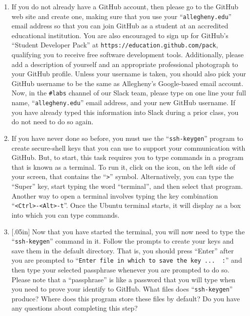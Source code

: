 \documentclass[11pt]{article}
\newcommand{\command}[1]{``\lstinline{#1}''}
\newcommand{\url}[1]{\lstinline{#1}}
\newcommand{\channel}[1]{\lstinline{#1}}
\newcommand{\think}[1]{\null\hfill\LARGE{\faCogs{}}\newline\scriptsize{\em{#1}}}
\begin{document}
\begin{enumerate}

  \item If you do not already have a GitHub account, then please go to the
    GitHub web site and create one, making sure that you use your
    \command{allegheny.edu} email address so that you can join GitHub as a
    student at an accredited educational institution. You are also encouraged
    to sign up for GitHub's ``Student Developer Pack'' at
    \url{https://education.github.com/pack}, qualifying you to receive free
    software development tools. Additionally, please add a description of
    yourself and an appropriate professional photograph to your GitHub profile.
    Unless your username is taken, you should also pick your GitHub username to
    be the same as Allegheny's Google-based email account. Now, in the
    \channel{#labs} channel of our Slack team, please type on one line your
    full name, \command{allegheny.edu} email address, and your new GitHub
    username. If you have already typed this information into Slack during a
    prior class, you do not need to do so again.

  \item If you have never done so before, you must use the \command{ssh-keygen}
    program to create secure-shell keys that you can use to support your
    communication with GitHub. But, to start, this task requires you to type
    commands in a program that is known as a terminal. To run it, click on the
    icon, on the left side of your screen, that contains the \command{>}
    symbol. Alternatively, you can type the ``Super'' key, start typing the
    word ``terminal'', and then select that program. Another way to open a
    terminal involves typing the key combination \command{<Ctrl>-<Alt>-t}. Once
    the Ubuntu terminal starts, it will display as a box into which you can
    type commands.

  \item \marginnote{\think{Understand SSH keys}}[.05in] Now that you have
    started the terminal, you will now need to type the \command{ssh-keygen}
    command in it. Follow the prompts to create your keys and save them in the
    default directory. That is, you should press ``Enter'' after you are
    prompted to \command{Enter file in which to save the key ...  :} and then
    type your selected passphrase whenever you are prompted to do so. Please
    note that a ``passphrase'' is like a password that you will type when you
    need to prove your identify to GitHub. What files does \command{ssh-keygen}
    produce? Where does this program store these files by default? Do you have
    any questions about completing this step?


\end{enumerate}
\end{document}
